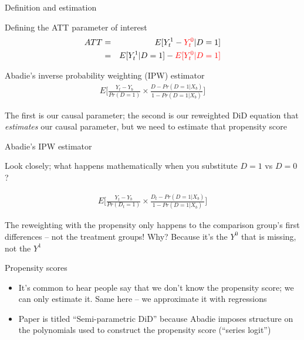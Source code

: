 \documentclass{beamer}
\begin{document}
\begin{frame}{Definition and estimation}

Defining the ATT parameter of interest
\begin{eqnarray*}
ATT &=& E[Y^1_t - \textcolor{red}{Y^0_t} |D=1] \\
&=&E[Y^1_t  | D = 1 ] - \textcolor{red}{E[Y^0_t | D=1]}
\end{eqnarray*}

\bigskip
Abadie's inverse probability weighting (IPW) estimator
\begin{eqnarray*}
E\bigg [ \frac{Y_t - Y_b}{Pr(D=1)} \times \frac{D - Pr(D=1|X_b)}{1-Pr(D=1|X_b)} \bigg ]
\end{eqnarray*}

\bigskip

The first is our causal parameter; the second is our reweighted DiD equation that \emph{estimates} our causal parameter, but we need to estimate that propensity score


\end{frame}

\begin{frame}{Abadie's IPW estimator}

Look closely; what happens mathematically when you substitute $D=1$ vs $D=0$?

\begin{eqnarray*}
E\bigg [ \frac{Y_t - Y_b}{Pr(D_t=1)} \times \frac{D_t - Pr(D=1|X_b)}{1-Pr(D=1|X_b)} \bigg ]
\end{eqnarray*}

\bigskip

The reweighting with the propensity only happens to the comparison group's first differences -- not the treatment groups!  Why?  Because it's the $Y^0$ that is missing, not the $Y^1$

\end{frame}



\begin{frame}{Propensity scores}

\begin{itemize}
\item It's common to hear people say that we don't know the propensity score; we can only estimate it. Same here -- we approximate it with regressions
\item Paper is titled ``Semi-parametric DiD'' because Abadie imposes structure on the polynomials used to construct the propensity score (``series logit'')
\end{itemize}

\end{frame}
\end{document}
